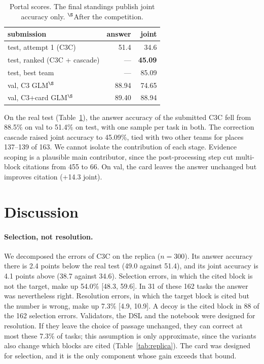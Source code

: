 \documentclass[11pt]{article}%
\begin{document}
\begin{table}[t]
\centering
\small
\begin{tabular}{lrr}
\toprule
submission & answer & joint \\
\midrule
test, attempt 1 (\textsc{C3C})       & 51.4 & 34.6 \\
test, ranked (\textsc{C3C} + cascade) & --- & \textbf{45.09} \\
test, best team                       & --- & 85.09 \\
\midrule
val, \textsc{C3} GLM$^\S$        & 88.94 & 74.65 \\
val, \textsc{C3}+card GLM$^\S$   & 89.40 & 88.94 \\
\bottomrule
\end{tabular}
\caption{Portal scores. The final standings publish joint accuracy only.
$^\S$After the competition.}
\label{tab:official}
\end{table}

On the real test (Table~\ref{tab:official}), the answer accuracy of the
submitted \textsc{C3C} fell from 88.5\% on val to 51.4\% on test, with one
sample per task in both. The correction cascade raised
joint accuracy to 45.09\%, tied with two other teams for places 137--139 of
163. We cannot isolate the contribution of each stage. Evidence scoping is a
plausible main contributor, since the post-processing step cut multi-block
citations from 455 to 66. On val, the card leaves the answer unchanged but
improves citation (+14.3 joint).

\section{Discussion}
\label{sec:discussion}

\paragraph{Selection, not resolution.} We decomposed the errors of
\textsc{C3C} on the replica ($n=300$). Its answer accuracy there is 2.4 points
below the real test (49.0 against 51.4), and its joint accuracy is 4.1 points
above (38.7 against 34.6). Selection
errors, in which the cited block is not the target, make up 54.0\%
[48.3, 59.6]. In 31 of these 162 tasks the answer was nevertheless right.
Resolution errors, in which the target block is cited but the number is wrong,
make up 7.3\% [4.9, 10.9]. A decoy is the cited block in 88 of the 162
selection errors. Validators, the DSL and the notebook were designed for resolution. If they
leave the choice of passage unchanged, they can correct at most these 7.3\% of
tasks; this assumption is only approximate, since the variants also change
which blocks are cited (Table~\ref{tab:replica}). The card was designed for
selection, and it is the only component whose gain exceeds that bound.
\end{document}

